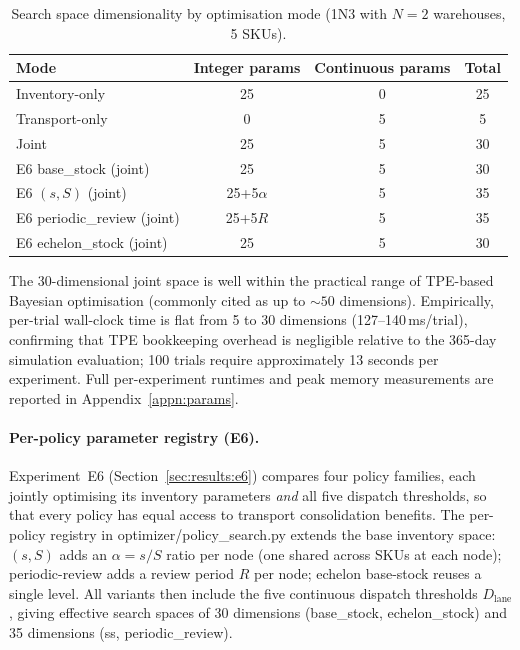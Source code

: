 \begin{table}[htbp]
  \centering
  \caption{Search space dimensionality by optimisation mode (1N3 with $N=2$ warehouses, 5 SKUs).}
  \label{tab:opt-dims}
  \begin{tabular}{@{}lccc@{}}
    \toprule
    Mode & Integer params & Continuous params & Total \\
    \midrule
    Inventory-only  & 25 & 0  & 25 \\
    Transport-only  & 0  & 5  & 5  \\
    Joint           & 25 & 5  & 30 \\
    \midrule
    E6 base\_stock (joint)     & 25 & 5  & 30 \\
    E6 $(s,S)$ (joint)        & 25+5$\alpha$ & 5 & 35 \\
    E6 periodic\_review (joint)& 25+5$R$      & 5 & 35 \\
    E6 echelon\_stock (joint)  & 25 & 5  & 30 \\
    \bottomrule
  \end{tabular}
\end{table}

The 30-dimensional joint space is well within the practical range of
TPE-based Bayesian optimisation (commonly cited as up to $\sim\!50$
dimensions).  Empirically, per-trial wall-clock time is flat from 5 to
30 dimensions (127--140\,ms/trial), confirming that TPE bookkeeping
overhead is negligible relative to the 365-day simulation evaluation;
100 trials require approximately 13 seconds per experiment.  Full
per-experiment runtimes and peak memory measurements are reported in
Appendix~\ref{appn:params}.

\paragraph{Per-policy parameter registry (E6).}
Experiment~E6 (Section~\ref{sec:results:e6}) compares four policy
families, each jointly optimising its inventory parameters
\emph{and} all five dispatch thresholds, so that every policy has
equal access to transport consolidation benefits.  The per-policy
registry in optimizer/policy\_search.py extends the base inventory
space: $(s,S)$ adds an $\alpha = s/S$ ratio per node (one shared across SKUs
at each node); periodic-review adds a review period $R$ per node;
echelon base-stock reuses a single level.  All variants then include the five continuous
dispatch thresholds $D_{\text{lane}}$, giving effective search
spaces of 30 dimensions (base\_stock, echelon\_stock) and 35
dimensions (ss, periodic\_review).
